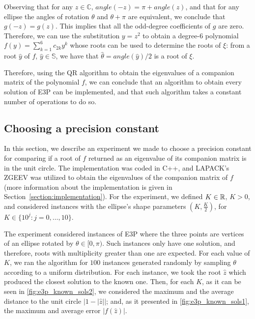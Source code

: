 Observing that for any $z\in \mathbb{C}$, $angle(-z)=\pi+angle(z)$, and that for any ellipse the angles of rotation $\theta$ and $\theta + \pi$ are equivalent, we conclude that $g(-z)=g(z)$. This implies that all the odd-degree coefficients of $g$ are zero. Therefore, we can use the substitution $y=z^2$ to obtain a degree-$6$ polynomial $f(y)=\sum_{k=1}^6 c_{2k} y^k$ whose roots can be used to determine the roots of $\xi$: from a root $\hat{y}$ of $f$, $\hat{y}\in\mathbb{S}$, we have that $\hat{\theta}=angle(\hat{y})/2$ is a root of $\xi$.

Therefore, using the QR algorithm to obtain the eigenvalues of a companion matrix of the polynomial $f$, we can conclude that an algorithm to obtain every solution of E3P can be implemented, and that such algorithm takes a constant number of operations to do so.


\subsection{Choosing a precision constant}

In this section, we describe an experiment we made to choose a precision constant for comparing if a root of $f$ returned as an eigenvalue of its companion matrix is in the unit circle. The implementation was coded in C++, and LAPACK's ZGEEV was utilized to obtain the eigenvalues of the companion matrix of $f$ (more information about the implementation is given in Section~\ref{section:implementation}). For the experiment, we defined $K\in\mathbb{R}$, $K>0$, and considered instances with the ellipse's shape parameters $(K, \frac{K}{2})$, for $K\in\{10^j\colon j=0,\dots,10\}$.

The experiment considered instances of E3P where the three points are vertices of an ellipse rotated by $\theta\in[0, \pi)$. Such instances only have one solution, and therefore, roots with multiplicity greater than one are expected.
For each value of $K$, we ran the algorithm for $100$ instances generated randomly by sampling $\theta$ according to a uniform distribution. For each instance, we took the root $\hat{z}$ which produced the closest solution to the known one. Then, for each $K$, as it can be seen in \autoref{fig:e3p_known_sols2}, we considered the maximum and the average distance to the unit circle $|1-|\hat{z}||$; and, as it presented in \autoref{fig:e3p_known_sols1}, the maximum and average error $|f(\hat{z})|$.

